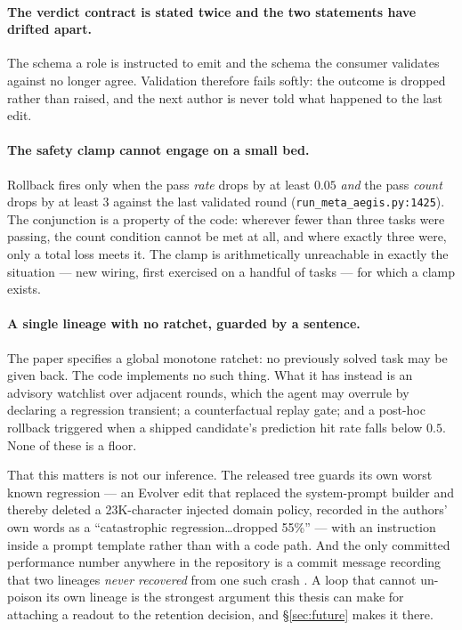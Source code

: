 \paragraph{The verdict contract is stated twice and the two statements have
drifted apart.} The schema a role is instructed to emit and the schema the
consumer validates against no longer agree. Validation therefore fails
softly: the outcome is dropped rather than raised, and the next author is
never told what happened to the last edit.

\paragraph{The safety clamp cannot engage on a small bed.} Rollback
fires only when the pass \emph{rate} drops by at least $0.05$ \emph{and}
the pass \emph{count} drops by at least $3$ against the last validated
round (\texttt{run\_meta\_aegis.py:1425}). The conjunction is a property
of the code: wherever fewer than three tasks were passing, the count
condition cannot be met at all, and where exactly three were, only a
total loss meets it. The clamp is arithmetically unreachable in exactly
the situation --- new wiring, first exercised on a handful of tasks ---
for which a clamp exists.

\paragraph{A single lineage with no ratchet, guarded by a sentence.} The
paper specifies a global monotone ratchet: no previously solved task may be
given back. The code implements no such thing. What it has instead is an
advisory watchlist over adjacent rounds, which the agent may overrule by
declaring a regression transient; a counterfactual replay gate; and a
post-hoc rollback triggered when a shipped candidate's prediction hit rate
falls below $0.5$. None of these is a floor.

That this matters is not our inference. The released tree guards its own
worst known regression --- an Evolver edit that replaced the system-prompt
builder and thereby deleted a 23K-character injected domain policy,
recorded in the authors' own words as a ``catastrophic
regression\ldots dropped 55\%'' --- with an instruction inside a prompt
template rather than with a code path. And the only committed performance
number anywhere in the repository is a commit message recording that two
lineages \emph{never recovered} from one such crash . A loop that
cannot un-poison its own lineage is the strongest argument this thesis can
make for attaching a readout to the retention decision, and
\S\ref{sec:future} makes it there.

